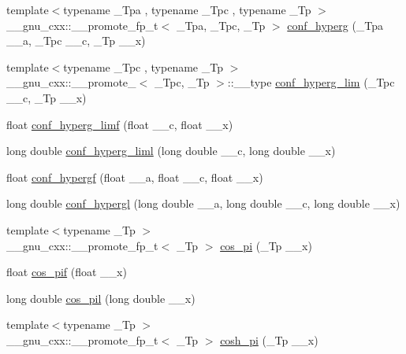 \begin{DoxyCompactItemize}
{\footnotesize template$<$typename \+\_\+\+Tpa , typename \+\_\+\+Tpc , typename \+\_\+\+Tp $>$ }\\\+\_\+\+\_\+gnu\+\_\+cxx\+::\+\_\+\+\_\+promote\+\_\+fp\+\_\+t$<$ \+\_\+\+Tpa, \+\_\+\+Tpc, \+\_\+\+Tp $>$ \hyperlink{group__gnu__math__spec__func_ga5e71f453c84b767792dc26ffda96f8fb}{conf\+\_\+hyperg} (\+\_\+\+Tpa \+\_\+\+\_\+a, \+\_\+\+Tpc \+\_\+\+\_\+c, \+\_\+\+Tp \+\_\+\+\_\+x)
\item 
{\footnotesize template$<$typename \+\_\+\+Tpc , typename \+\_\+\+Tp $>$ }\\\+\_\+\+\_\+gnu\+\_\+cxx\+::\+\_\+\+\_\+promote\+\_$<$ \+\_\+\+Tpc, \+\_\+\+Tp $>$\+::\+\_\+\+\_\+type \hyperlink{group__gnu__math__spec__func_gab923b5a9e67469a5145d7bfcb20b3396}{conf\+\_\+hyperg\+\_\+lim} (\+\_\+\+Tpc \+\_\+\+\_\+c, \+\_\+\+Tp \+\_\+\+\_\+x)
\item 
float \hyperlink{group__gnu__math__spec__func_ga609879a370bc4e9fc70563806bc49cb9}{conf\+\_\+hyperg\+\_\+limf} (float \+\_\+\+\_\+c, float \+\_\+\+\_\+x)
\item 
long double \hyperlink{group__gnu__math__spec__func_ga367be9b77eb1f9ccc2971d5300da48d1}{conf\+\_\+hyperg\+\_\+liml} (long double \+\_\+\+\_\+c, long double \+\_\+\+\_\+x)
\item 
float \hyperlink{group__gnu__math__spec__func_gabd18e600aa78c3f2b2f835039506c810}{conf\+\_\+hypergf} (float \+\_\+\+\_\+a, float \+\_\+\+\_\+c, float \+\_\+\+\_\+x)
\item 
long double \hyperlink{group__gnu__math__spec__func_ga0a9853f30d8fa515a12cd45a92da832e}{conf\+\_\+hypergl} (long double \+\_\+\+\_\+a, long double \+\_\+\+\_\+c, long double \+\_\+\+\_\+x)
\item 
{\footnotesize template$<$typename \+\_\+\+Tp $>$ }\\\+\_\+\+\_\+gnu\+\_\+cxx\+::\+\_\+\+\_\+promote\+\_\+fp\+\_\+t$<$ \+\_\+\+Tp $>$ \hyperlink{group__gnu__math__spec__func_ga05f183d57b1726136ba9795ba1b158c5}{cos\+\_\+pi} (\+\_\+\+Tp \+\_\+\+\_\+x)
\item 
float \hyperlink{group__gnu__math__spec__func_gaddcae99c1572af6fa1d79b9cfa053033}{cos\+\_\+pif} (float \+\_\+\+\_\+x)
\item 
long double \hyperlink{group__gnu__math__spec__func_ga9b6816c0abf30fd88417d79a33cb5465}{cos\+\_\+pil} (long double \+\_\+\+\_\+x)
\item 
{\footnotesize template$<$typename \+\_\+\+Tp $>$ }\\\+\_\+\+\_\+gnu\+\_\+cxx\+::\+\_\+\+\_\+promote\+\_\+fp\+\_\+t$<$ \+\_\+\+Tp $>$ \hyperlink{group__gnu__math__spec__func_ga633224563637e80a4cda93863a693ad6}{cosh\+\_\+pi} (\+\_\+\+Tp \+\_\+\+\_\+x)

\end{DoxyCompactItemize}
